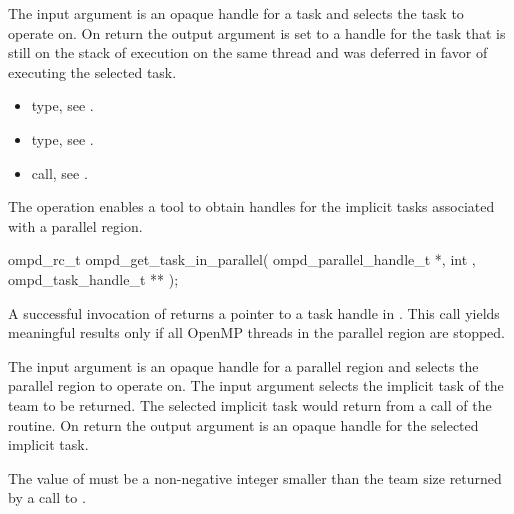 \argdesc
The input argument  is an opaque handle for a task and selects the task to operate on.
On return the output argument  is set to a handle for the task that is
still on the stack of execution on the same thread and was deferred in favor of executing the selected task.

\crossreferences
\begin{itemize}
  \item {} type, see .
	\item {} type, see .
	\item {} call, see .
\end{itemize}

\label{subsubsubsec:ompd_get_task_in_parallel}
\summary
The   operation enables a tool to obtain handles for
the implicit tasks associated with a parallel region.

\format

\begin{cspecific}
\begin{ompSyntax}
ompd_rc_t ompd_get_task_in_parallel(
  ompd_parallel_handle_t *,
  int ,
  ompd_task_handle_t **
);
\end{ompSyntax}
\end{cspecific}


\descr
A successful invocation of   returns a pointer to
a task handle in .
This call yields meaningful results only if all OpenMP threads in the parallel
region are stopped.

\argdesc
The input argument  is an opaque handle for a parallel region
and selects the parallel region to operate on.
The input argument  selects the implicit task of the team to be 
returned.
The selected implicit task would return  from a call of the 
 routine.
On return the output argument  is an opaque handle for the selected 
implicit task.

\restrictions
The value of  must be a non-negative integer smaller than the
team size returned by a call to .

